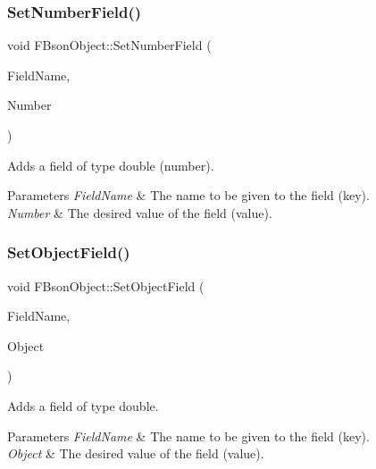 \subsubsection{\texorpdfstring{Set\+Number\+Field()}{SetNumberField()}}
{\footnotesize\ttfamily void F\+Bson\+Object\+::\+Set\+Number\+Field (\begin{DoxyParamCaption}\item[{const F\+String \&}]{Field\+Name,  }\item[{double}]{Number }\end{DoxyParamCaption})}

Adds a field of type double (number).


\begin{DoxyParams}{Parameters}
{\em Field\+Name} & The name to be given to the field (key). \\
\hline
{\em Number} & The desired value of the field (value). \\
\hline
\end{DoxyParams}
\mbox{\label{class_f_bson_object_aba8c25dce5711747c222bb11d4d769c5}} 
\subsubsection{\texorpdfstring{Set\+Object\+Field()}{SetObjectField()}}
{\footnotesize\ttfamily void F\+Bson\+Object\+::\+Set\+Object\+Field (\begin{DoxyParamCaption}\item[{const F\+String \&}]{Field\+Name,  }\item[{const T\+Shared\+Ptr$<$ \mbox{\hyperlink{class_f_bson_object}{F\+Bson\+Object}} $>$ \&}]{Object }\end{DoxyParamCaption})}

Adds a field of type double.


\begin{DoxyParams}{Parameters}
{\em Field\+Name} & The name to be given to the field (key). \\
\hline
{\em Object} & The desired value of the field (value). \\
\hline
\end{DoxyParams}
\mbox{\label{class_f_bson_object_a97b99487e75dc6f366c95e841d006a3d}} 
